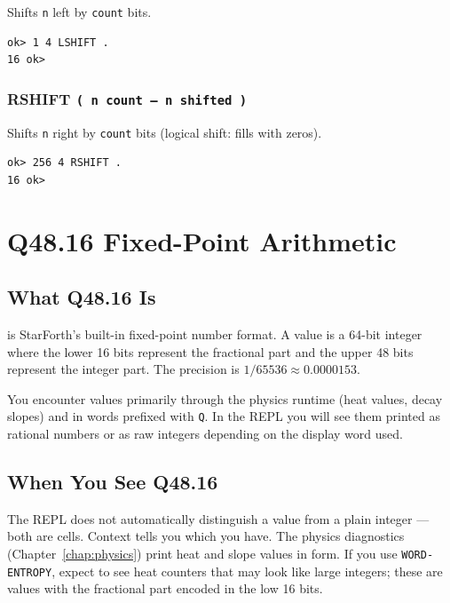 Shifts \texttt{n} left by \texttt{count} bits.

\begin{lstlisting}[language=Forth]
ok> 1 4 LSHIFT .
16 ok>
\end{lstlisting}

\subsection*{RSHIFT \texttt{( n count -- n shifted )}}

Shifts \texttt{n} right by \texttt{count} bits (logical shift: fills with
zeros).

\begin{lstlisting}[language=Forth]
ok> 256 4 RSHIFT .
16 ok>
\end{lstlisting}

\chapter{Q48.16 Fixed-Point Arithmetic}
\label{chap:q48-16}

\section{What Q48.16 Is}
\label{sec:q48-what}

\Qtype{} is StarForth's built-in fixed-point number format. A \Qtype{} value
is a 64-bit integer where the lower 16 bits represent the fractional part and
the upper 48 bits represent the integer part. The precision is
$1/65536 \approx 0.0000153$.

You encounter \Qtype{} values primarily through the physics runtime (heat
values, decay slopes) and in words prefixed with \texttt{Q}. In the REPL you
will see them printed as rational numbers or as raw integers depending on the
display word used.

\section{When You See Q48.16}
\label{sec:q48-when}

The REPL does not automatically distinguish a \Qtype{} value from a plain
integer --- both are cells. Context tells you which you have. The physics
diagnostics (Chapter~\ref{chap:physics}) print heat and slope values in
\Qtype{} form. If you use \texttt{WORD-ENTROPY}, expect to see heat counters
that may look like large integers; these are \Qtype{} values with the fractional
part encoded in the low 16 bits.

